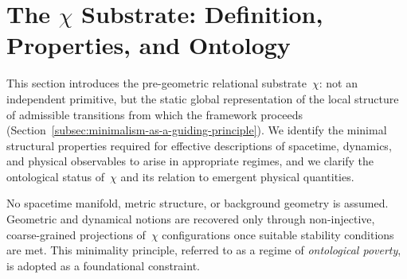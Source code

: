 \clearpage

\section{The \texorpdfstring{$\chi$}{χ} Substrate: Definition, Properties, and Ontology}
\label{sec:definition-and-fundamental-properties-of-the-chi-field}

This section introduces the pre-geometric relational substrate~$\chi$: not an
independent primitive, but the static global representation of the local structure
of admissible transitions from which the framework proceeds
(Section~\ref{subsec:minimalism-as-a-guiding-principle}).
We identify the minimal structural properties required for effective
descriptions of spacetime, dynamics, and physical observables to arise in
appropriate regimes, and we clarify the ontological status of~$\chi$ and its
relation to emergent physical quantities.

No spacetime manifold, metric structure, or background geometry is assumed.
Geometric and dynamical notions are recovered only through non-injective,
coarse-grained projections of~$\chi$ configurations once suitable stability
conditions are met.
This minimality principle, referred to as a regime of \emph{ontological
poverty}, is adopted as a foundational constraint.












